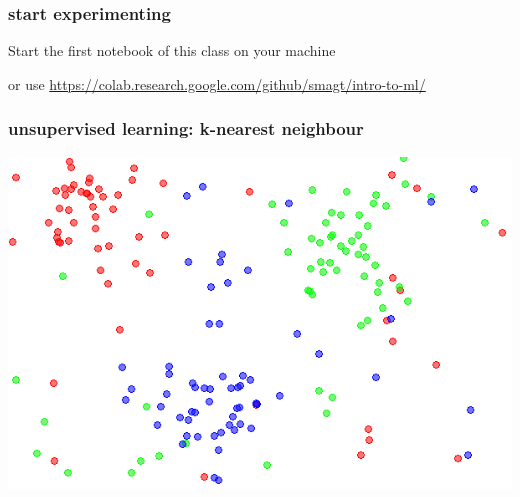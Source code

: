 \documentclass[USenglish,pdftex,compress,10pt,svgnamesi]{beamer}%
\begin{document}
%
%
%
%
%
%
%
%
%
%



%
%
%


\begin{frame}
\frametitle{start experimenting}

Start the first notebook of this class on your machine

or use 
\url{https://colab.research.google.com/github/smagt/intro-to-ml/}

\end{frame}


\begin{frame}
\frametitle{unsupervised learning: k-nearest neighbour}

 \includegraphics[width=\textwidth]{knn}

\end{frame}
\end{document}
